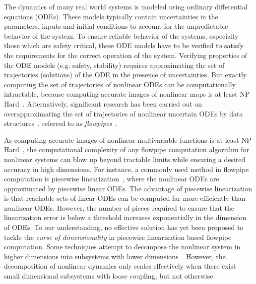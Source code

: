 The dynamics of many real world systems is modeled using ordinary
differential equations (ODEs).  These models typically contain
uncertainties in the parameters, inputs and initial conditions to
account for the unpredictable behavior of the system.  To ensure
reliable behavior of the systems, especially those which are safety
critical, these ODE models have to be verified to satisfy the
requirements for the correct operation of the system.  Verifying
properties of the ODE models (e.g. safety, stability) requires
approximating the set of trajectories (solutions) of the ODE in the
presence of uncertainties.  But exactly computing the set of
trajectories of nonlinear ODEs can be computationally intractable,
because computing accurate images of nonlinear maps is at least NP
Hard~\cite{murty1985some}.  Alternatively, significant research has
been carried out on overapproximating the set of trajectories of
nonlinear uncertain ODEs by data
structures~\cite{chen2012taylor,testylier2013nltoolbox,althoff2013reachability,kochdumper2020sparse,ramdani2009hybrid,han2006reachability,maidens2014reachability},
referred to as \emph{flowpipes}~\cite{chen2012taylor}.

As computing accurate images of nonlinear multivariable
functions is at least NP Hard~\cite{murty1985some}, the
computational complexity of any flowpipe computation algorithm for
nonlinear systems can blow up beyond tractable limits while ensuring a
desired accuracy in high dimensions.  For instance, a commonly used
method in flowpipe computation is piecewise
linearization~\cite{ramdani2009hybrid,han2006reachability,althoff2008reachability,li2020reachability,dang2010accurate,bak2016scalable},
where the nonlinear ODEs are approximated by piecewise linear ODEs.
The advantage of piecewise linearization is that reachable sets of
linear ODEs can be computed far more efficiently than nonlinear ODEs.
However, the number of pieces required to ensure that the
linearization error is below a threshold increases exponentially in
the dimension of ODEs.  To our understanding, no effective solution
has yet been proposed to tackle the \emph{curse of dimensionality} in
piecewise linearization based flowpipe computation.  Some techniques
attempt to decompose the nonlinear system in higher dimensions into
subsystems with lower
dimensions~\cite{chen2018decomposition,chen2016decomposed}.  However,
the decomposition of nonlinear dynamics only scales effectively when
there exist small dimensional subsystems with loose coupling, but not
otherwise.

